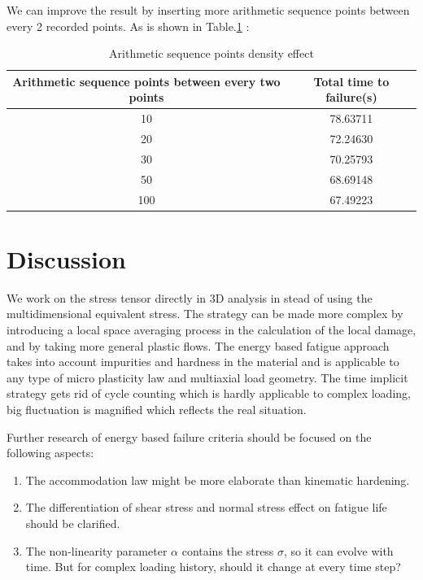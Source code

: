 \documentclass[3p,times,number,review]{elsarticle}
\begin{document}
We can improve the result by inserting more arithmetic sequence points between every 2 recorded points. As is shown in Table.\ref{steppoints} :

\begin{table}[!h]
	\centering
	\caption{Arithmetic sequence points density effect}
	\label{steppoints}
\begin{tabular}{cc}
	\hline
	\textbf{Arithmetic sequence points between every two points} & \textbf{Total time to failure(s)} \\ \hline
	10                                                           & 78.63711                          \\ 
	20                                                           & 72.24630                          \\ 
	30                                                           & 70.25793                          \\ 
	50                                                           & 68.69148                          \\ 
	100                                                          & 67.49223                          \\ \hline
\end{tabular}
\end{table}

 
 
\clearpage
\section{Discussion}
We work on the stress tensor directly in 3D analysis in stead of using the multidimensional equivalent stress.
The strategy can be made more complex by introducing a local space averaging process in the calculation of the local damage, and by taking more general plastic flows. The energy based fatigue approach takes into account impurities and hardness in the material and is applicable to any type of micro plasticity law and multiaxial load geometry. The time implicit strategy gets rid of cycle counting which is hardly applicable to complex loading, big fluctuation is magnified which reflects the real situation.

Further research of energy based failure criteria should be focused on the following aspects:
\begin{enumerate}
\item The accommodation law might be more elaborate than kinematic hardening.

\vspace{6pt}
\item The differentiation of shear stress and normal stress effect on fatigue life should be clarified.

\vspace{6pt}
\item The non-linearity parameter $\alpha$ contains the stress $\sigma$, so it can evolve with time. But for complex loading history, should it change at every time step?

\end{enumerate}
\end{document}
